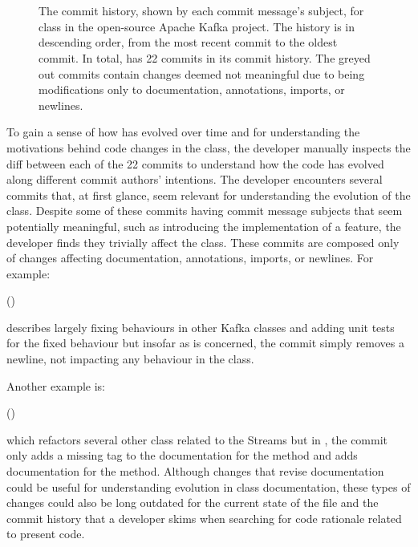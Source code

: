 \begin{figure}
\begin{mdframed}
\begin{RaggedRight}
		\textcolor{gray}{} \\
		 \\
	\end{RaggedRight}
	\end{mdframed}
	\caption{The commit history, shown by each commit message's subject, for   class in the open-source Apache Kafka project. 
		The history is in descending order, from the most recent commit to the oldest commit.
		In total,  has 22 commits in its commit history. The greyed out commits contain changes deemed not meaningful due to being modifications only to documentation, annotations, imports, or newlines.
	}
	\label{fig:Topology-Commit-History}
\end{figure}

To gain a sense of how  has evolved over time 
and for understanding the motivations behind code changes in the class, 
the developer manually inspects the diff between each of the 22 commits to understand 
how the code has evolved along different commit authors' intentions.
The developer encounters several commits that, at first glance, 
seem relevant for understanding the evolution of the  class.
Despite some of these commits having commit message subjects that seem potentially 
meaningful, such as introducing the implementation of a feature, 
the developer finds they trivially affect the  class.
These commits are composed only of changes affecting documentation, annotations, imports, or newlines.
For example: 

\begin{center}
	 ()
\end{center}

\noindent describes largely fixing behaviours in other Kafka classes and adding unit tests for the fixed behaviour 
but insofar as  is concerned, the commit simply removes a newline, not impacting any behaviour in the class.

Another example is: 

\begin{center}
	 ()
\end{center}

\noindent which refactors several other class related to the Streams  
but in , the commit only adds a missing  tag 
to the documentation for the  method 
and adds documentation for the  method.
Although changes that revise documentation could be useful for understanding evolution in class documentation, 
these types of changes could also be long outdated for the current state of the file 
and  the commit history that a developer skims when searching for code rationale related to present code.

